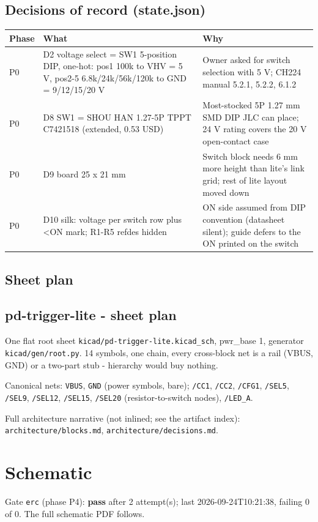\documentclass[11pt,a4paper]{article}
\begin{document}
\subsection*{Decisions of record (state.json)}
{\small
\begin{longtable}{lp{5.2cm}p{7.2cm}}
\toprule
\textbf{Phase} & \textbf{What} & \textbf{Why} \\
\midrule
\endhead
P0 & D2 voltage select = SW1 5-position DIP, one-hot: pos1 100k to VHV = 5 V, pos2-5 6.8k/24k/56k/120k to GND = 9/12/15/20 V & Owner asked for switch selection with 5 V; CH224 manual 5.2.1, 5.2.2, 6.1.2 \\
P0 & D8 SW1 = SHOU HAN 1.27-5P TPPT C7421518 (extended, 0.53 USD) & Most-stocked 5P 1.27 mm SMD DIP JLC can place; 24 V rating covers the 20 V open-contact case \\
P0 & D9 board 25 x 21 mm & Switch block needs 6 mm more height than lite's link grid; rest of lite layout moved down \\
P0 & D10 silk: voltage per switch row plus \textless{}ON mark; R1-R5 refdes hidden & ON side assumed from DIP convention (datasheet silent); guide defers to the ON printed on the switch \\
\bottomrule
\end{longtable}
}
\subsection*{Sheet plan}
\subsection*{pd-trigger-lite - sheet plan}
One flat root sheet \texttt{kicad/pd-trigger-lite.kicad\_sch}, pwr\_base 1, generator \texttt{kicad/gen/root.py}. 14 symbols, one chain, every cross-block net is a rail (VBUS, GND) or a two-part stub - hierarchy would buy nothing.

Canonical nets: \texttt{VBUS}, \texttt{GND} (power symbols, bare); \texttt{/CC1}, \texttt{/CC2}, \texttt{/CFG1}, \texttt{/SEL5}, \texttt{/SEL9}, \texttt{/SEL12}, \texttt{/SEL15}, \texttt{/SEL20} (resistor-to-switch nodes), \texttt{/LED\_A}.

Full architecture narrative (not inlined; see the artifact index): \texttt{architecture/blocks.md}, \texttt{architecture/decisions.md}.
\section{Schematic}
Gate \texttt{erc} (phase P4): \textbf{pass} after 2 attempt(s); last 2026-09-24T10:21:38, failing 0 of 0.
The full schematic PDF follows.

\end{document}
